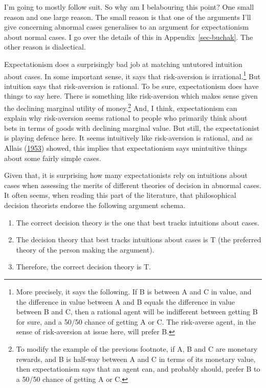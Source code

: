 \documentclass[
  12pt,
  letterpaper,
  DIV=11,
  numbers=noendperiod]{scrreprt}
\providecommand{\tightlist}{%
  \setlength{\itemsep}{0pt}\setlength{\parskip}{0pt}}\usepackage{longtable,booktabs,array}
\begin{document}
I'm going to mostly follow suit. So why am I belabouring this point? One
small reason and one large reason. The small reason is that one of the
arguments I'll give concerning abnormal cases generalises to an argument
for expectationism about normal cases. I go over the details of this in
Appendix~\ref{sec-buchak}. The other reason is dialectical.

Expectationism does a surprisingly bad job at matching untutored
intuition about cases. In some important sense, it says that
risk-aversion is irrational.\footnote{More precisely, it says the
  following. If B is between A and C in value, and the difference in
  value between A and B equals the difference in value between B and C,
  then a rational agent will be indifferent between getting B for sure,
  and a 50/50 chance of getting A or C. The risk-averse agent, in the
  sense of risk-aversion at issue here, will prefer B.} But intuition
says that risk-aversion is rational. To be sure, expectationism does
have things to say here. There is something like risk-aversion which
makes sense given the declining marginal utility of money.\footnote{To
  modify the example of the previous footnote, if A, B and C are
  monetary rewards, and B is half-way between A and C in terms of its
  monetary value, then expectationism says that an agent can, and
  probably should, prefer B to a 50/50 chance of getting A or C.} And, I
think, expectationism can explain why risk-aversion seems rational to
people who primarily think about bets in terms of goods with declining
marginal value. But still, the expectationist is playing defence here.
It seems intuitively like risk-aversion is rational, and as Allais
(\protect\hyperlink{ref-Allais1953}{1953}) showed, this implies that
expectationism says unintuitive things about some fairly simple cases.

Given that, it is surprising how many expectationists rely on intuitions
about cases when assessing the merits of different theories of decision
in abnormal cases. It often seems, when reading this part of the
literature, that philosophical decision theorists endorse the following
argument schema.

\begin{enumerate}
\def\labelenumi{\arabic{enumi}.}
\tightlist
\item
  The correct decision theory is the one that best tracks intuitions
  about cases.
\item
  The decision theory that best tracks intuitions about cases is T (the
  preferred theory of the person making the argument).
\item
  Therefore, the correct decision theory is T.
\end{enumerate}
\end{document}
